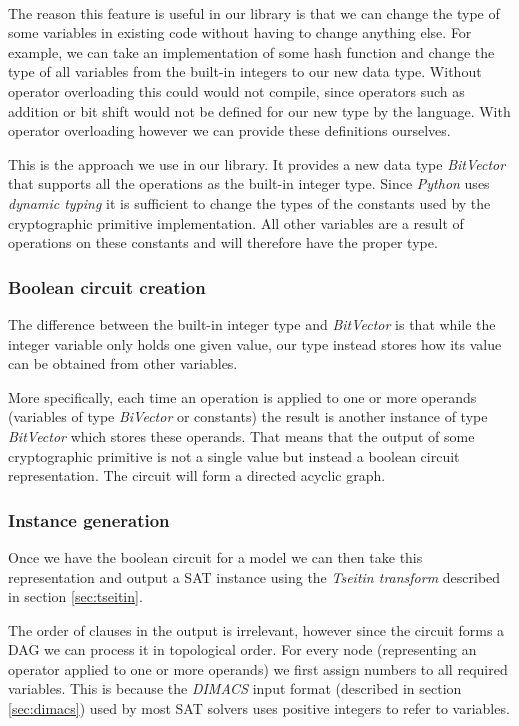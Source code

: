~\\

The reason this feature is useful in our library is that we can change the type of some variables in existing code without having to change anything else.
For example, we can take an implementation of some hash function and change the type of all variables from the built-in integers to our new data type.
Without operator overloading this could would not compile, since operators such as addition or bit shift would not be defined for our new type by the language.
With operator overloading however we can provide these definitions ourselves.

This is the approach we use in our library.
It provides a new data type \emph{BitVector} that supports all the operations as the built-in integer type.
Since \emph{Python} uses \emph{dynamic typing} it is sufficient to change the types of the constants used by the cryptographic primitive implementation.
All other variables are a result of operations on these constants and will therefore have the proper type.

\subsubsection{Boolean circuit creation}
The difference between the built-in integer type and \emph{BitVector} is that while the integer variable only holds one given value, our type instead stores how its value can be obtained from other variables.

More specifically, each time an operation is applied to one or more operands (variables of type \emph{BiVector} or constants) the result is another instance of type \emph{BitVector} which stores these operands.  That means that the output of some cryptographic primitive is not a single value but instead a boolean circuit representation. The circuit will form a directed acyclic graph.

\subsubsection{Instance generation}
Once we have the boolean circuit for a model we can then take this representation and output a SAT instance using the \emph{Tseitin transform} described in section \ref{sec:tseitin}.

The order of clauses in the output is irrelevant, however since the circuit forms a DAG we can process it in topological order.
For every node (representing an operator applied to one or more operands) we first assign numbers to all required variables.
This is because the \emph{DIMACS} input format (described in section \ref{sec:dimacs}) used by most SAT solvers uses positive integers to refer to variables.

